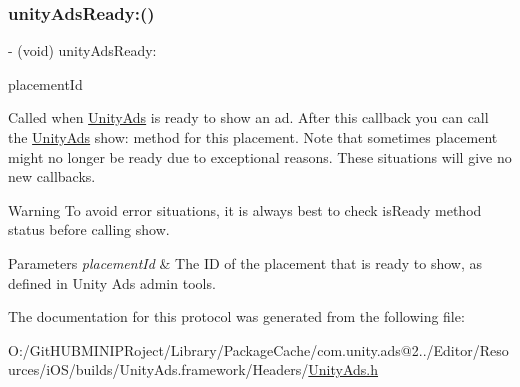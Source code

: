 \subsubsection{\texorpdfstring{unityAdsReady:()}{unityAdsReady:()}}
{\footnotesize\ttfamily -\/ (void) unity\+Ads\+Ready\+: \begin{DoxyParamCaption}\item[{(N\+S\+String $\ast$)}]{placement\+Id }\end{DoxyParamCaption}}

Called when {\ttfamily \mbox{\hyperlink{interface_unity_ads}{Unity\+Ads}}} is ready to show an ad. After this callback you can call the {\ttfamily \mbox{\hyperlink{interface_unity_ads}{Unity\+Ads}}} {\ttfamily show\+:} method for this placement. Note that sometimes placement might no longer be ready due to exceptional reasons. These situations will give no new callbacks.

\begin{DoxyWarning}{Warning}
To avoid error situations, it is always best to check {\ttfamily is\+Ready} method status before calling show. 
\end{DoxyWarning}

\begin{DoxyParams}{Parameters}
{\em placement\+Id} & The ID of the placement that is ready to show, as defined in Unity Ads admin tools. \\
\hline
\end{DoxyParams}


The documentation for this protocol was generated from the following file\+:\begin{DoxyCompactItemize}
\item 
O\+:/\+Git\+H\+U\+B\+M\+I\+N\+I\+P\+Roject/\+Library/\+Package\+Cache/com.\+unity.\+ads@2../\+Editor/\+Resources/i\+O\+S/builds/\+Unity\+Ads.\+framework/\+Headers/\mbox{\hyperlink{_unity_ads_8h}{Unity\+Ads.\+h}}\end{DoxyCompactItemize}
